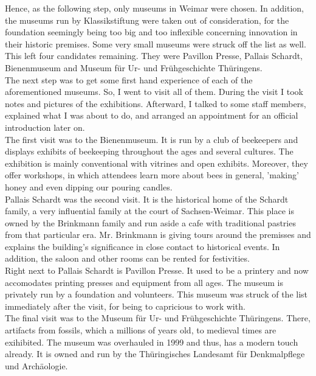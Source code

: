 Hence, as the following step, only museums in Weimar were chosen. In addition, the museums run by Klassikstiftung were taken out of consideration, for the foundation seemingly being too big and too inflexible concerning innovation in their historic premises. Some very small museums were struck off the list as well. This left four candidates remaining. They were Pavillon Presse, Pallais Schardt, Bienenmuseum and Museum für Ur- und Frühgeschichte Thüringens.
\\
The next step was to get some first hand experience of each of the aforementioned museums. So, I went to visit all of them. During the visit I took notes and pictures of the exhibitions. Afterward, I talked to some staff members, explained what I was about to do, and arranged an appointment for an official introduction later on.
\\
The first visit was to the Bienenmuseum. It is run by a club of beekeepers and displays exhibits of beekeeping throughout the ages and several cultures. The exhibition is mainly conventional with vitrines and open exhibits. Moreover, they offer workshops, in which attendees learn more about bees in general, 'making' honey and even dipping our pouring candles.
\\
Pallais Schardt was the second visit. It is the historical home of the Schardt family, a very influential family at the court of Sachsen-Weimar. This place is owned by the Brinkmann family and run aside a cafe with traditional pastries from that particular era. Mr. Brinkmann is giving tours around the premisses and explains the building's significance in close contact to historical events. In addition, the saloon and other rooms can be rented for festivities.
\\
Right next to Pallais Schardt is Pavillon Presse. It used to be a printery and now accomodates printing presses and equipment from all ages. The museum is privately run by a foundation and volunteers. This museum was struck of the list immediately after the visit, for being to capricious to work with.
\\
The final visit was to the Museum für Ur- und Frühgeschichte Thüringens. There, artifacts from fossils, which a millions of years old, to medieval times are exihibited. The museum was overhauled in 1999 and thus, has a modern touch already. It is owned and run by the Thüringisches Landesamt für Denkmalpflege und Archäologie.

